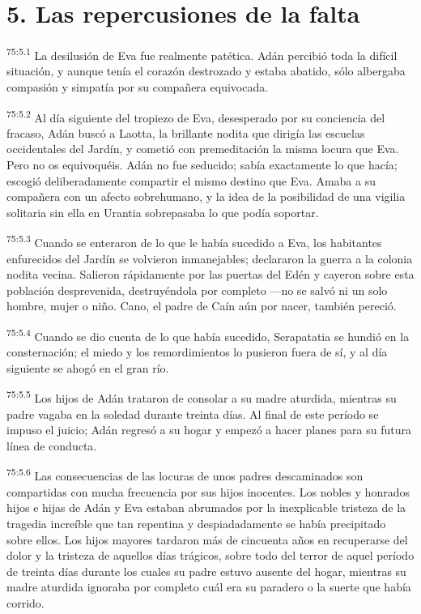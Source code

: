 \section*{5. Las repercusiones de la falta}
\par
\textsuperscript{75:5.1} La desilusión de Eva fue realmente patética. Adán percibió toda la difícil situación, y aunque tenía el corazón destrozado y estaba abatido, sólo albergaba compasión y simpatía por su compañera equivocada.

\par
\textsuperscript{75:5.2} Al día siguiente del tropiezo de Eva, desesperado por su conciencia del fracaso, Adán buscó a Laotta, la brillante nodita que dirigía las escuelas occidentales del Jardín, y cometió con premeditación la misma locura que Eva. Pero no os equivoquéis. Adán no fue seducido; sabía exactamente lo que hacía; escogió deliberadamente compartir el mismo destino que Eva. Amaba a su compañera con un afecto sobrehumano, y la idea de la posibilidad de una vigilia solitaria sin ella en Urantia sobrepasaba lo que podía soportar.

\par
\textsuperscript{75:5.3} Cuando se enteraron de lo que le había sucedido a Eva, los habitantes enfurecidos del Jardín se volvieron inmanejables; declararon la guerra a la colonia nodita vecina. Salieron rápidamente por las puertas del Edén y cayeron sobre esta población desprevenida, destruyéndola por completo ---no se salvó ni un solo hombre, mujer o niño. Cano, el padre de Caín aún por nacer, también pereció.

\par
\textsuperscript{75:5.4} Cuando se dio cuenta de lo que había sucedido, Serapatatia se hundió en la consternación; el miedo y los remordimientos lo pusieron fuera de sí, y al día siguiente se ahogó en el gran río.

\par
\textsuperscript{75:5.5} Los hijos de Adán trataron de consolar a su madre aturdida, mientras su padre vagaba en la soledad durante treinta días. Al final de este período se impuso el juicio; Adán regresó a su hogar y empezó a hacer planes para su futura línea de conducta.

\par
\textsuperscript{75:5.6} Las consecuencias de las locuras de unos padres descaminados son compartidas con mucha frecuencia por sus hijos inocentes. Los nobles y honrados hijos e hijas de Adán y Eva estaban abrumados por la inexplicable tristeza de la tragedia increíble que tan repentina y despiadadamente se había precipitado sobre ellos. Los hijos mayores tardaron más de cincuenta años en recuperarse del dolor y la tristeza de aquellos días trágicos, sobre todo del terror de aquel período de treinta días durante los cuales su padre estuvo ausente del hogar, mientras su madre aturdida ignoraba por completo cuál era su paradero o la suerte que había corrido.

